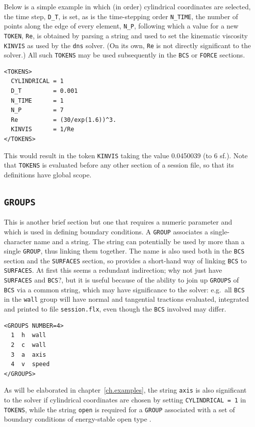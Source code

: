 \documentclass[11pt]{report}
\newcommand{\eg}{e.g.\ } \newcommand{\CC}{\mathrm{c.c.}}
\begin{document}
Below is a simple example in which (in order) cylindrical coordinates
are selected, the time step, \verb|D_T|, is set, as is the
time-stepping order \verb|N_TIME|, the number of points along the edge
of every element, \verb|N_P|, following which a value for a new
\verb|TOKEN|, \verb|Re|, is obtained by parsing a string and used to
set the kinematic viscosity \verb|KINVIS| as used by the \verb|dns|
solver.  (On its own, \verb|Re| is not directly significant to the
solver.) All such \verb|TOKENS| may be used subsequently in the
\verb|BCS| or \verb|FORCE| sections.
%
{\small
\begin{verbatim}
<TOKENS>
  CYLINDRICAL = 1
  D_T         = 0.001
  N_TIME      = 1
  N_P         = 7
  Re          = (30/exp(1.6))^3.
  KINVIS      = 1/Re
</TOKENS>
\end{verbatim}
}
%
This would result in the token \verb|KINVIS| taking the value
0.0450039 (to 6 sf.). Note that \verb|TOKENS| is evaluated before any
other section of a session file, so that its definitions have global
scope.

\subsection{\texttt{GROUPS}}
\label{sec.groups}

This is another brief section but one that requires a numeric
parameter and which is used in defining boundary conditions. A
\verb|GROUP| associates a single-character name and a string.  The
string can potentially be used by more than a single \verb|GROUP|,
thus linking them together.  The name is also used both in the
\verb|BCS| section and the \verb|SURFACES| section, so provides a
short-hand way of linking \verb|BCS| to \verb|SURFACES|.  At first
this seems a redundant indirection; why not just have \verb|SURFACES|
and \verb|BCS|?, but it is useful because of the ability to join up
\verb|GROUPS| of \verb|BCS| via a common string, which may have
significance to the solver: \eg all \verb|BCS| in the \verb|wall|
group will have normal and tangential tractions evaluated, integrated
and printed to file \verb|session.flx|, even though the \verb|BCS|
involved may differ.
%
{\small
\begin{verbatim}
<GROUPS NUMBER=4>
  1  h  wall
  2  c  wall
  3  a  axis
  4  v  speed
</GROUPS>
\end{verbatim}
}
%
As will be elaborated in chapter~\ref{ch.examples}, the string
\verb|axis| is also significant to the solver if cylindrical
coordinates are chosen by setting \verb|CYLINDRICAL = 1| in
\verb|TOKENS|, while the string \verb|open| is required for a
\verb|GROUP| associated with a set of boundary conditions of
energy-stable open type \citep{dong15}.
\end{document}

